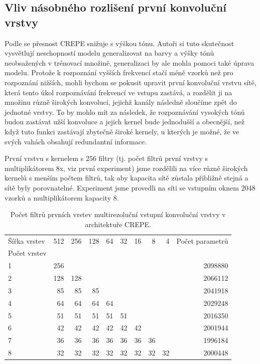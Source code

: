 

\subsection{Vliv násobného rozlišení první konvoluční vrstvy}\label{exp:crepe_multirozliseni}

Podle \cite{Kim2018} se přesnost CREPE snižuje s výškou tónu. Autoři si tuto skutečnost vysvětlují neschopností modelu generalizovat na barvy a výšky tónů neobsažených v trénovací množině, generalizaci by ale mohla pomoci také úprava modelu. Protože k rozpoznání vyšších frekvencí stačí méně vzorků než pro rozpoznání nižších, mohli bychom se pokusit upravit první konvoluční vrstvu sítě, která tento úkol rozpoznávání frekvencí ve vstupu zastává, a rozdělit ji na množinu různě širokých konvolucí, jejichž kanály následně sloučíme zpět do jednotné vrstvy. To by mohlo mít za následek, že rozpoznávání vysokých tónů budou zastávat užší konvoluce a jejich kernel bude jednodušší a obecnější, než když tuto funkci zastávají zbytečně široké kernely, u kterých je možné, že ve svých vahách obsahují redundantní informace.

První vrstvu s kernelem s 256 filtry (tj. počet filtrů první vrstvy s multiplikátorem 8x, viz první experiment) jsme rozdělili na více různě širokých kernelů s menším počtem filtrů, tak aby kapacita sítě zůstala přibližně stejná a sítě byly porovnatelné. Experiment jsme provedli na síti se vstupním oknem 2048 vzorků a multiplikátorem kapacity 8.

\begin{table}[h!]
\centering
    \begin{tabular}{lrrrrrrrrr}
    \toprule
    Šířka vrstev & 512 & 256 & 128 & 64 & 32 & 16 & 8  & 4  & Počet parametrů  \\
    Počet vrstev & {} & {} & {} & {} & {} & {} & {}  & {}  & {}  \\
    \midrule
    1                   & 256 &     &     &    &    &    &    &    & 2098880 \\
    2                   & 128 & 128 &     &    &    &    &    &    & 2066112 \\
    3                   & 85  & 85  & 85  &    &    &    &    &    & 2041918 \\
    4                   & 64  & 64  & 64  & 64 &    &    &    &    & 2029248 \\
    5                   & 51  & 51  & 51  & 51 & 51 &    &    &    & 2016350 \\
    6                   & 42  & 42  & 42  & 42 & 42 & 42 &    &    & 2001944 \\
    7                   & 36  & 36  & 36  & 36 & 36 & 36 & 36 &    & 1996184 \\
    8                   & 32  & 32  & 32  & 32 & 32 & 32 & 32 & 32 & 2000448 \\
    \bottomrule
    \end{tabular}
\caption{Počet filtrů prvních vrstev multirezoluční vstupní konvoluční vrstvy v architektuře CREPE.}\label{tab:crepe_velikosti_multirozliseni}
\end{table}

